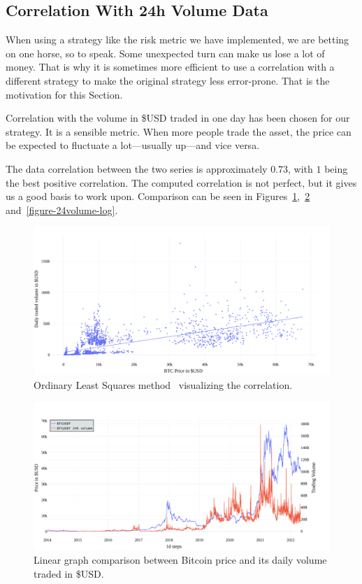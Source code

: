 \subsection*{Correlation With 24h Volume Data}
\label{subsection-24hvolume-correlation}
When using a strategy like the risk metric we have implemented, we are betting on one horse, so to speak. Some unexpected turn can make us lose a lot of money. That is why it is sometimes more efficient to use a correlation with a different strategy to make the original strategy less error-prone. That is the motivation for this Section.

Correlation with the volume in \$USD traded in one day has been chosen for our strategy. It is a sensible metric. When more people trade the asset, the price can be expected to fluctuate a lot---usually up---and vice versa.

The data correlation between the two series is approximately $0.73$, with $1$ being the best positive correlation. The computed correlation is not perfect, but it gives us a good basis to work upon. Comparison can be seen in Figures~\ref{figure-24volume-ols},~\ref{figure-24volume-lin} and~\ref{figure-24volume-log}.

\begin{figure}[!t]
    \centering
    \includegraphics[width=\columnwidth]{figures/24volume-ols.pdf}
    \caption{Ordinary Least Squares method~\cite{wikipedia:ols} visualizing the correlation.}
    \label{figure-24volume-ols}
\end{figure}

\begin{figure}[!t]
    \centering
    \includegraphics[width=\columnwidth]{figures/24volume-lin.pdf}
    \caption{Linear graph comparison between Bitcoin price and its daily volume traded in \$USD.}
    \label{figure-24volume-lin}
\end{figure}

